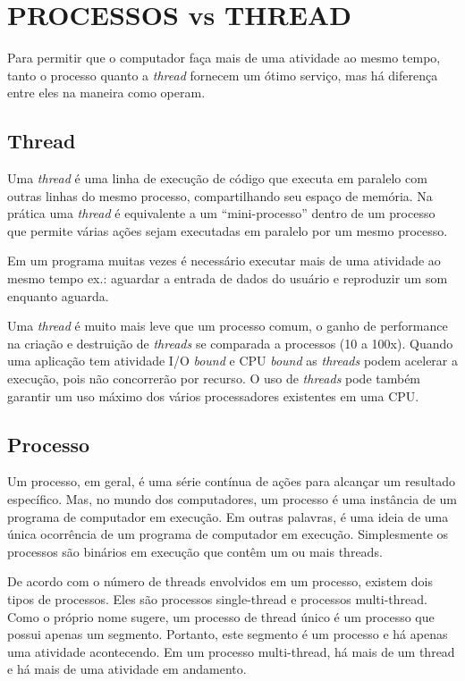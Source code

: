 
\chapter{PROCESSOS vs THREAD}
\label{sec:thread}

Para permitir que o computador faça mais de uma atividade ao mesmo tempo, tanto o processo quanto a \textit{thread} fornecem um ótimo serviço, mas há diferença entre eles na maneira como operam.

\nocite{processo}

\section{Thread}

Uma \textit{thread} é uma linha de execução de código que executa em paralelo com outras
linhas do mesmo processo, compartilhando seu espaço de memória.
Na prática uma \textit{thread} é equivalente a um “mini-processo” dentro de um processo que permite várias ações sejam executadas em paralelo por um mesmo processo.

Em um programa muitas vezes é necessário executar mais de uma atividade ao mesmo tempo ex.: aguardar a entrada de dados do usuário e reproduzir um som enquanto aguarda.

Uma \textit{thread} é muito mais leve que um processo comum, o ganho de performance na criação e destruição de \textit{threads} se comparada a processos (10 a 100x). Quando uma aplicação tem atividade I/O \textit{bound} e CPU \textit{bound} as \textit{threads} podem acelerar a execução, pois não concorrerão por recurso.
O uso de \textit{threads} pode também garantir um uso máximo dos vários processadores
existentes em uma CPU.

\section{Processo}

Um processo, em geral, é uma série contínua de ações para alcançar um resultado específico. Mas, no mundo dos computadores, um processo é uma instância de um programa de computador em execução. Em outras palavras, é uma ideia de uma única ocorrência de um programa de computador em execução. Simplesmente os processos são binários em execução que contêm um ou mais threads.

De acordo com o número de threads envolvidos em um processo, existem dois tipos de processos. Eles são processos single-thread e processos multi-thread. Como o próprio nome sugere, um processo de thread único é um processo que possui apenas um segmento. Portanto, este segmento é um processo e há apenas uma atividade acontecendo. Em um processo multi-thread, há mais de um thread e há mais de uma atividade em andamento.

